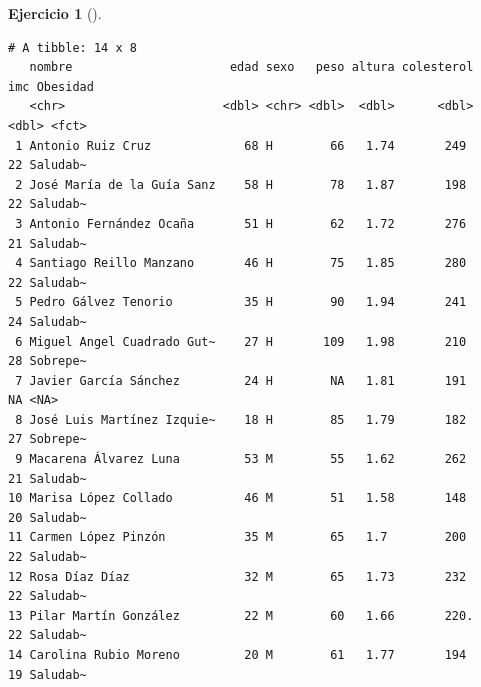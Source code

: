 \documentclass[
  spanish,
  a4paper,
]{scrreport}
\theoremstyle{definition}
\newtheorem{exercise}{Ejercicio}[chapter]
\theoremstyle{remark}
\begin{document}
\begin{exercise}[]
\begin{enumerate}
\begin{tcolorbox}
\begin{verbatim}
# A tibble: 14 x 8
   nombre                      edad sexo   peso altura colesterol   imc Obesidad
   <chr>                      <dbl> <chr> <dbl>  <dbl>      <dbl> <dbl> <fct>   
 1 Antonio Ruiz Cruz             68 H        66   1.74       249     22 Saludab~
 2 José María de la Guía Sanz    58 H        78   1.87       198     22 Saludab~
 3 Antonio Fernández Ocaña       51 H        62   1.72       276     21 Saludab~
 4 Santiago Reillo Manzano       46 H        75   1.85       280     22 Saludab~
 5 Pedro Gálvez Tenorio          35 H        90   1.94       241     24 Saludab~
 6 Miguel Angel Cuadrado Gut~    27 H       109   1.98       210     28 Sobrepe~
 7 Javier García Sánchez         24 H        NA   1.81       191     NA <NA>    
 8 José Luis Martínez Izquie~    18 H        85   1.79       182     27 Sobrepe~
 9 Macarena Álvarez Luna         53 M        55   1.62       262     21 Saludab~
10 Marisa López Collado          46 M        51   1.58       148     20 Saludab~
11 Carmen López Pinzón           35 M        65   1.7        200     22 Saludab~
12 Rosa Díaz Díaz                32 M        65   1.73       232     22 Saludab~
13 Pilar Martín González         22 M        60   1.66       220.    22 Saludab~
14 Carolina Rubio Moreno         20 M        61   1.77       194     19 Saludab~
\end{verbatim}

  \end{tcolorbox}
\end{enumerate}

\end{exercise}
\end{document}
